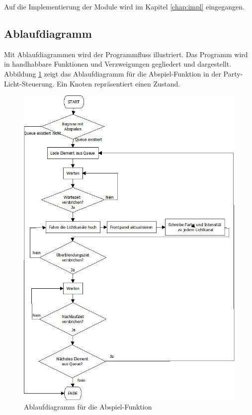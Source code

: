 Auf die Implementierung der Module wird im Kapitel \ref{chap:impl} eingegangen.

\subsection{Ablaufdiagramm }
Mit Ablaufdiagrammen wird der Programmfluss illustriert. Das Programm wird in handhabbare Funktionen und Verzweigungen gegliedert und dargestellt.
Abbildung \ref{fig:plan01} zeigt das Ablaufdiagramm für die Abspiel-Funktion in der Party-Licht-Steuerung. 
Ein Knoten repräsentiert einen Zustand.
	\begin{figure}[!ht]
	\centering
		\includegraphics[height=0.9\textheight]{Pics/play-flowchart.jpeg}
	\caption{Ablaufdiagramm für die Abspiel-Funktion}
	\label{fig:plan01}
	\end{figure}	
		

